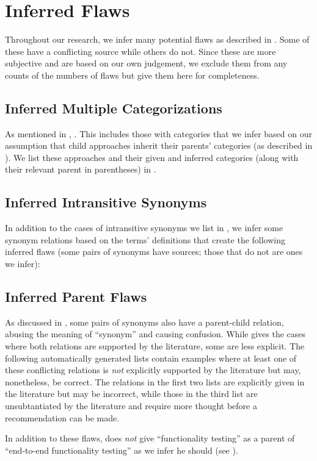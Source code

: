 \section{Inferred Flaws}\label{infer-flaws}
Throughout our research, we infer many potential flaws as described in
. Some of these have a conflicting source while others do not.
Since these are more subjective and are based on our own judgement, we
exclude them from any counts of the numbers of flaws but give them here for
completeness.

\subsection{Inferred Multiple Categorizations}\label{infMultiCats}
As mentioned in , \multiCatIntro{}. This includes those with
categories that we infer based on our assumption that child approaches
inherit their parents' categories (as described in ). We list
these approaches and their given and inferred categories (along with their
relevant parent in parentheses) in .



\newpage

\subsection{Inferred Intransitive Synonyms}\label{infMultiSyns}
In addition to the \multiSynCount{} cases of intransitive synonyms we list in
, we infer some synonym relations based on the terms'
definitions that create the following inferred flaws (some pairs of synonyms
have sources; those that do not are ones we infer):

\begin{enumerate}
    
\end{enumerate}

\subsection{Inferred Parent Flaws}\label{infParSyns}
As discussed in , some pairs of synonyms also have a
parent-child relation, abusing the meaning of ``synonym'' and causing
confusion. While  gives the cases where both relations
are supported by the literature, some are less explicit. The
following automatically generated lists contain examples where at least
one of these conflicting relations is \emph{not} explicitly supported by the
literature but may, nonetheless, be correct. The relations in the first two
lists are explicitly given in the literature but may be incorrect, while
those in the third list are unsubtantiated by the literature and require
more thought before a recommendation can be made.



In addition to these flaws, \citep[Tab.~2]{Gerrard2000a} does
\emph{not} give ``functionality testing'' as a parent of ``end-to-end
functionality testing'' as we infer he should (see ).
